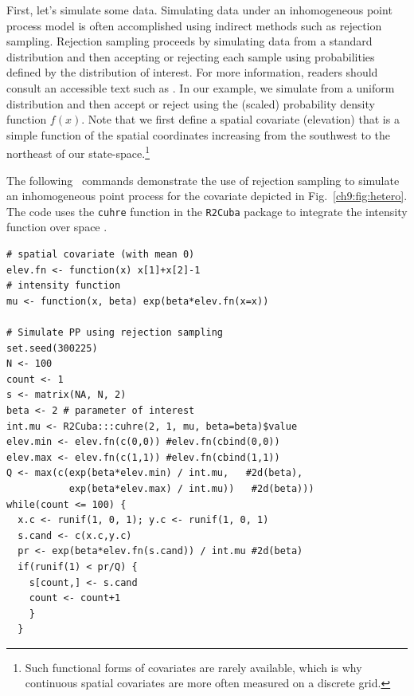 First, let's simulate some data. Simulating data under an inhomogeneous point process model is often
accomplished using indirect methods such as rejection
sampling. Rejection sampling proceeds by
simulating data from a standard distribution and then accepting or
rejecting each sample using probabilities defined by the distribution
of interest. For more information, readers should consult an
accessible text such as \citet{robert_casella:2004}. In our example, we
simulate from a uniform distribution and then accept or reject using
the (scaled) probability density function $f(x)$. Note that we first define a
spatial covariate (elevation) that is a simple function of the spatial
coordinates increasing from the southwest to the northeast of our
state-space.\footnote{Such functional forms of
covariates are rarely available, which is why continuous spatial
covariates are more often measured on a discrete grid.}

The following \R~commands demonstrate the use of rejection sampling to
simulate an inhomogeneous point process for the covariate depicted in
Fig.~\ref{ch9:fig:hetero}. The code uses the \verb+cuhre+ function in
the {\tt R2Cuba} package to integrate the intensity function over
space \citep{hahn_etal:2011}.

\begin{small}
\begin{verbatim}
# spatial covariate (with mean 0)
elev.fn <- function(x) x[1]+x[2]-1
# intensity function
mu <- function(x, beta) exp(beta*elev.fn(x=x))

# Simulate PP using rejection sampling
set.seed(300225)
N <- 100
count <- 1
s <- matrix(NA, N, 2)
beta <- 2 # parameter of interest
int.mu <- R2Cuba:::cuhre(2, 1, mu, beta=beta)$value
elev.min <- elev.fn(c(0,0)) #elev.fn(cbind(0,0))
elev.max <- elev.fn(c(1,1)) #elev.fn(cbind(1,1))
Q <- max(c(exp(beta*elev.min) / int.mu,   #2d(beta),
           exp(beta*elev.max) / int.mu))   #2d(beta)))
while(count <= 100) {
  x.c <- runif(1, 0, 1); y.c <- runif(1, 0, 1)
  s.cand <- c(x.c,y.c)
  pr <- exp(beta*elev.fn(s.cand)) / int.mu #2d(beta)
  if(runif(1) < pr/Q) {
    s[count,] <- s.cand
    count <- count+1
    }
  }
\end{verbatim}
\end{small}


